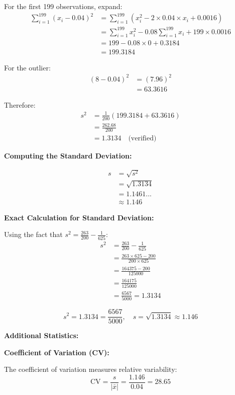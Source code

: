 \documentclass[12pt]{article}
\begin{document}
\begin{solution}
For the first 199 observations, expand:
\begin{align*}
\sum_{i=1}^{199}(x_i - 0.04)^2 &= \sum_{i=1}^{199}(x_i^2 - 2 \times 0.04 \times x_i + 0.0016) \\
&= \sum_{i=1}^{199}x_i^2 - 0.08\sum_{i=1}^{199}x_i + 199 \times 0.0016 \\
&= 199 - 0.08 \times 0 + 0.3184 \\
&= 199.3184
\end{align*}

For the outlier:
\begin{align*}
(8 - 0.04)^2 &= (7.96)^2 \\
&= 63.3616
\end{align*}

Therefore:
\begin{align*}
s^2 &= \frac{1}{200}(199.3184 + 63.3616) \\
&= \frac{262.68}{200} \\
&= 1.3134 \quad \text{(verified)}
\end{align*}

\textbf{Computing the Standard Deviation:}

\begin{align*}
s &= \sqrt{s^2} \\
&= \sqrt{1.3134} \\
&= 1.1461... \\
&\approx 1.146
\end{align*}

\textbf{Exact Calculation for Standard Deviation:}

Using the fact that \(s^2 = \frac{263}{200} - \frac{1}{625}\):
\begin{align*}
s^2 &= \frac{263}{200} - \frac{1}{625} \\
&= \frac{263 \times 625 - 200}{200 \times 625} \\
&= \frac{164375 - 200}{125000} \\
&= \frac{164175}{125000} \\
&= \frac{6567}{5000} = 1.3134
\end{align*}

\[
\boxed{s^2 = 1.3134 = \frac{6567}{5000}, \quad s = \sqrt{1.3134} \approx 1.146}
\]

\textbf{Additional Statistics:}

\textbf{Coefficient of Variation (CV):}

The coefficient of variation measures relative variability:
\[
\text{CV} = \frac{s}{|\bar{x}|} = \frac{1.146}{0.04} = 28.65
\]


\end{solution}
\end{document}
